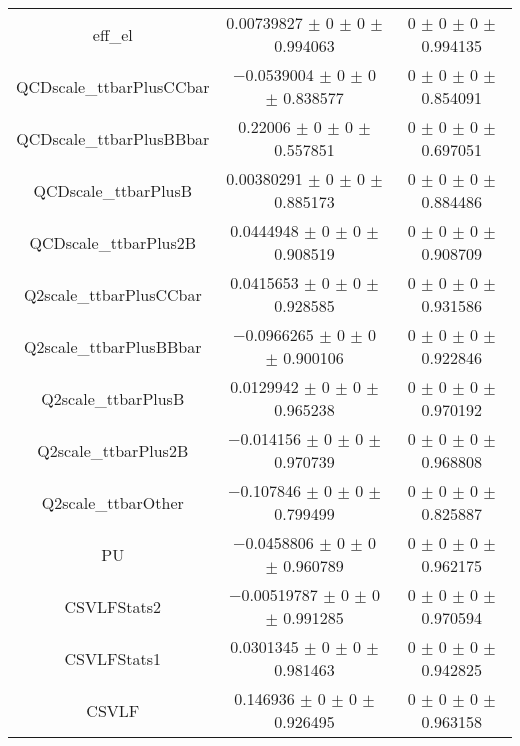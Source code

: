 \begin{table}
\begin{tabular}{ccc}
eff\_el 	& \num{0.00739827} $\pm$ \num{0} $\pm$ \num{0} $\pm$ \num{0.994063} 	& \num{0} $\pm$ \num{0} $\pm$ \num{0} $\pm$ \num{0.994135}\\
QCDscale\_ttbarPlusCCbar 	& \num{-0.0539004} $\pm$ \num{0} $\pm$ \num{0} $\pm$ \num{0.838577} 	& \num{0} $\pm$ \num{0} $\pm$ \num{0} $\pm$ \num{0.854091}\\
QCDscale\_ttbarPlusBBbar 	& \num{0.22006} $\pm$ \num{0} $\pm$ \num{0} $\pm$ \num{0.557851} 	& \num{0} $\pm$ \num{0} $\pm$ \num{0} $\pm$ \num{0.697051}\\
QCDscale\_ttbarPlusB 	& \num{0.00380291} $\pm$ \num{0} $\pm$ \num{0} $\pm$ \num{0.885173} 	& \num{0} $\pm$ \num{0} $\pm$ \num{0} $\pm$ \num{0.884486}\\
QCDscale\_ttbarPlus2B 	& \num{0.0444948} $\pm$ \num{0} $\pm$ \num{0} $\pm$ \num{0.908519} 	& \num{0} $\pm$ \num{0} $\pm$ \num{0} $\pm$ \num{0.908709}\\
Q2scale\_ttbarPlusCCbar 	& \num{0.0415653} $\pm$ \num{0} $\pm$ \num{0} $\pm$ \num{0.928585} 	& \num{0} $\pm$ \num{0} $\pm$ \num{0} $\pm$ \num{0.931586}\\
Q2scale\_ttbarPlusBBbar 	& \num{-0.0966265} $\pm$ \num{0} $\pm$ \num{0} $\pm$ \num{0.900106} 	& \num{0} $\pm$ \num{0} $\pm$ \num{0} $\pm$ \num{0.922846}\\
Q2scale\_ttbarPlusB 	& \num{0.0129942} $\pm$ \num{0} $\pm$ \num{0} $\pm$ \num{0.965238} 	& \num{0} $\pm$ \num{0} $\pm$ \num{0} $\pm$ \num{0.970192}\\
Q2scale\_ttbarPlus2B 	& \num{-0.014156} $\pm$ \num{0} $\pm$ \num{0} $\pm$ \num{0.970739} 	& \num{0} $\pm$ \num{0} $\pm$ \num{0} $\pm$ \num{0.968808}\\
Q2scale\_ttbarOther 	& \num{-0.107846} $\pm$ \num{0} $\pm$ \num{0} $\pm$ \num{0.799499} 	& \num{0} $\pm$ \num{0} $\pm$ \num{0} $\pm$ \num{0.825887}\\
PU 	& \num{-0.0458806} $\pm$ \num{0} $\pm$ \num{0} $\pm$ \num{0.960789} 	& \num{0} $\pm$ \num{0} $\pm$ \num{0} $\pm$ \num{0.962175}\\
CSVLFStats2 	& \num{-0.00519787} $\pm$ \num{0} $\pm$ \num{0} $\pm$ \num{0.991285} 	& \num{0} $\pm$ \num{0} $\pm$ \num{0} $\pm$ \num{0.970594}\\
CSVLFStats1 	& \num{0.0301345} $\pm$ \num{0} $\pm$ \num{0} $\pm$ \num{0.981463} 	& \num{0} $\pm$ \num{0} $\pm$ \num{0} $\pm$ \num{0.942825}\\
CSVLF 	& \num{0.146936} $\pm$ \num{0} $\pm$ \num{0} $\pm$ \num{0.926495} 	& \num{0} $\pm$ \num{0} $\pm$ \num{0} $\pm$ \num{0.963158}\\

\end{tabular}
\end{table}

